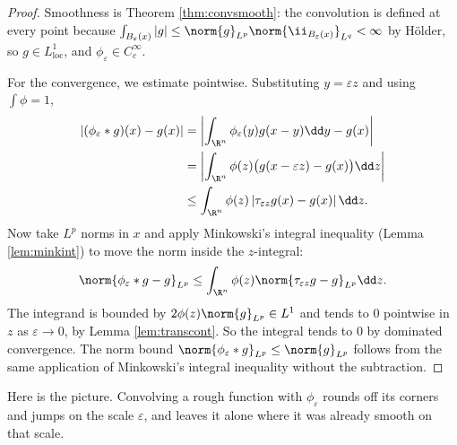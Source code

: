 \begin{proof}
	Smoothness is Theorem \ref{thm:convsmooth}: the convolution is defined at every point because $\int_{B_\varepsilon(x)} |g| \le \norm{g}_{L^p}\norm{\ii_{B_\varepsilon(x)}}_{L^q} < \infty$ by H\"older, so $g \in L^1_{\mathrm{loc}}$, and $\phi_\varepsilon \in C_c^\infty$.

	For the convergence, we estimate pointwise. Substituting $y = \varepsilon z$ and using $\int \phi = 1$,
	\begin{align*}
		|(\phi_\varepsilon * g)(x) - g(x)| &= \left| \int_{\R^n} \phi_\varepsilon(y) g(x - y) \dd y - g(x) \right| \\
		&= \left| \int_{\R^n} \phi(z) \big( g(x - \varepsilon z) - g(x)\big) \dd z \right| \\
		&\le \int_{\R^n} \phi(z) \left| \tau_{\varepsilon z} g(x) - g(x) \right| \dd z.
	\end{align*}
	Now take $L^p$ norms in $x$ and apply Minkowski's integral inequality (Lemma \ref{lem:minkint}) to move the norm inside the $z$-integral:
	$$\norm{\phi_\varepsilon * g - g}_{L^p} \le \int_{\R^n} \phi(z) \norm{\tau_{\varepsilon z} g - g}_{L^p} \dd z.$$
	The integrand is bounded by $2\phi(z)\norm{g}_{L^p} \in L^1$ and tends to $0$ pointwise in $z$ as $\varepsilon \to 0$, by Lemma \ref{lem:transcont}. So the integral tends to $0$ by dominated convergence. The norm bound $\norm{\phi_\varepsilon * g}_{L^p} \le \norm{g}_{L^p}$ follows from the same application of Minkowski's integral inequality without the subtraction.
\end{proof}

Here is the picture. Convolving a rough function with $\phi_\varepsilon$ rounds off its corners and jumps on the scale $\varepsilon$, and leaves it alone where it was already smooth on that scale.

\begin{center}
\end{center}

